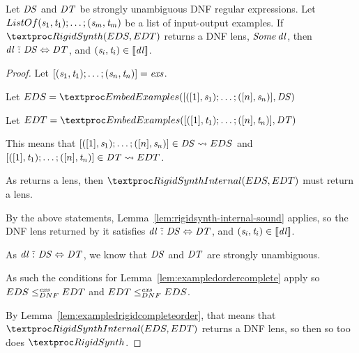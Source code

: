 \documentclass[acmsmall]{acmart}
\begin{document}
\begin{lemma}
  \label{lem:rigidsynth-sound}
  Let $\mathit{DS}$ and $\mathit{DT}$ be strongly unambiguous DNF regular
  expressions.
  Let $ListOf{(\mathit{s}_1,\mathit{t}_1);\ldots;(\mathit{s}_m,\mathit{t}_m)}$ be a
  list of input-output examples.
  If $\RigidSynth(\ExampledDNFRegex,\ExampledDNFRegexAlt)$ returns
  a DNF lens, $\mathit{Some}\,\mathit{dl}$, then  $\mathit{dl} \,\,\tilde{:}\,\, \mathit{DS} 
  \Leftrightarrow \mathit{DT}$, and $(\mathit{s}_i,\mathit{t}_i) \in
  [ \! [\mathit{dl}] \! ]$. 
\end{lemma}
\begin{proof}
  Let $[ (\mathit{s}_1,\mathit{t}_1);\ldots;(\mathit{s}_n,\mathit{t}_n) ] =
  \mathit{exs}$.
  
  Let $\ExampledDNFRegex =
  \EmbedExamplesOf{\ListOf{([1],\String_1);\ldots;([n],\String_n)}}{\DNFRegex}$

  Let $\ExampledDNFRegexAlt = \EmbedExamplesOf{\ListOf{([1],\StringAlt_1);\ldots;([n],\StringAlt_n)}}{\DNFRegexAlt}$

  This means that $[ ([1],\mathit{s}_1);\ldots;([n],\mathit{s}_n) ] \in \mathit{DS}
  \rightsquigarrow EDS$ and
  $[ ([1],\mathit{t}_1);\ldots;([n],\mathit{t}_n) ] \in \mathit{DT}
  \rightsquigarrow EDT$.

  As \RigidSynth{} returns a lens, then
  $\RigidSynthInternal(\ExampledDNFRegex,\ExampledDNFRegexAlt)$ must return a
  lens.

  By the above statements, Lemma~\ref{lem:rigidsynth-internal-sound} applies, so
  the DNF lens returned by it satisfies $\mathit{dl} \,\,\tilde{:}\,\, \mathit{DS}
  \Leftrightarrow \mathit{DT}$, and
  $(\mathit{s}_i,\mathit{t}_i)\in[ \! [\mathit{dl}] \! ]$.

  As $\mathit{dl} \,\,\tilde{:}\,\, \mathit{DS} \Leftrightarrow \mathit{DT}$, we
  know that $\mathit{DS}$ and $\mathit{DT}$ are strongly unambiguous.

  As such the conditions for Lemma~\ref{lem:exampledordercomplete} apply so
  $EDS \leq_{DNF}^{\mathit{exs}} EDT$ and
  $EDT \leq_{DNF}^{\mathit{exs}} EDS$.

  By Lemma~\ref{lem:exampledrigidcompleteorder}, that means that
  $\RigidSynthInternal(\ExampledDNFRegex,\ExampledDNFRegexAlt)$ returns a DNF
  lens, so then so too does $\RigidSynth$.




\end{proof}
\end{document}
